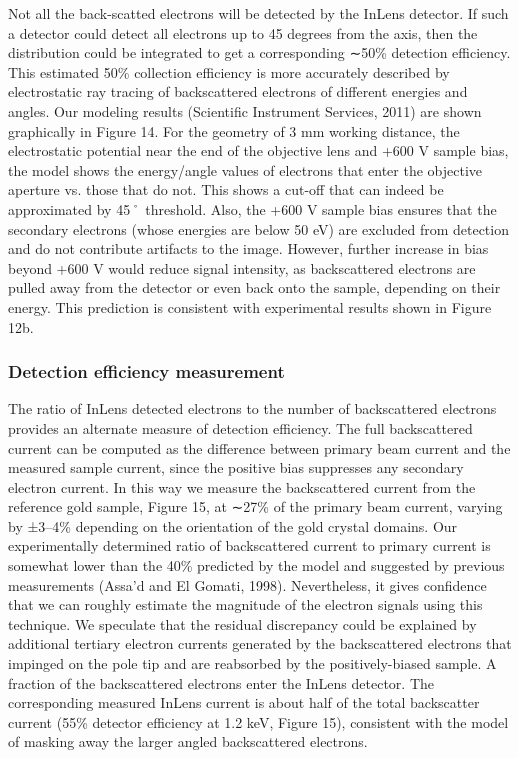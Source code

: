 \documentclass{article}
\begin{document}
Not all the back-scatted electrons will be detected by the InLens detector. If such a detector could detect all electrons up to 45 degrees from the axis, then the distribution could be integrated to get a corresponding ∼50\% detection efficiency. This estimated 50\% collection efficiency is more accurately described by electrostatic ray tracing of backscattered electrons of different energies and angles. Our modeling results (Scientific Instrument Services, 2011) are shown graphically in Figure 14. For the geometry of 3 mm working distance, the electrostatic potential near the end of the objective lens and +600 V sample bias, the model shows the energy/angle values of electrons that enter the objective aperture vs. those that do not. This shows a cut-off that can indeed be approximated by 45˚ threshold. Also, the +600 V sample bias ensures that the secondary electrons (whose energies are below 50 eV) are excluded from detection and do not contribute artifacts to the image. However, further increase in bias beyond +600 V would reduce signal intensity, as backscattered electrons are pulled away from the detector or even back onto the sample, depending on their energy. This prediction is consistent with experimental results shown in Figure 12b.

\subsubsection*{Detection efficiency measurement}

The ratio of InLens detected electrons to the number of backscattered electrons provides an alternate measure of detection efficiency. The full backscattered current can be computed as the difference between primary beam current and the measured sample current, since the positive bias suppresses any secondary electron current. In this way we measure the backscattered current from the reference gold sample, Figure 15, at ∼27\% of the primary beam current, varying by ±3–4\% depending on the orientation of the gold crystal domains. Our experimentally determined ratio of backscattered current to primary current is somewhat lower than the 40\% predicted by the model and suggested by previous measurements (Assa’d and El Gomati, 1998). Nevertheless, it gives confidence that we can roughly estimate the magnitude of the electron signals using this technique. We speculate that the residual discrepancy could be explained by additional tertiary electron currents generated by the backscattered electrons that impinged on the pole tip and are reabsorbed by the positively-biased sample. A fraction of the backscattered electrons enter the InLens detector. The corresponding measured InLens current is about half of the total backscatter current (55\% detector efficiency at 1.2 keV, Figure 15), consistent with the model of masking away the larger angled backscattered electrons.
\end{document}
